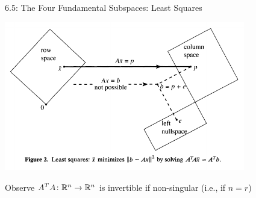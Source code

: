 \documentclass[10pt,english,aspectratio=169]{beamer}
\begin{document}
\begin{frame}{6.5: The Four Fundamental Subspaces: Least Squares}

\hspace*{-4mm}
\includegraphics[width=105mm]{figures/strang_fig2}

Observe $A^T A \colon \mathbb{R}^n \to \mathbb{R}^n$ is invertible if non-singular (i.e., if $n=r$)

\let\thefootnote\relax\footnotetext{\hspace*{-4mm} {\tiny Figure from ``The Fundamental Theorem of Linear Algebra'' by Gilbert Strang, The American Mathematical Monthly, Nov. 1993 }}

\end{frame}
\end{document}
